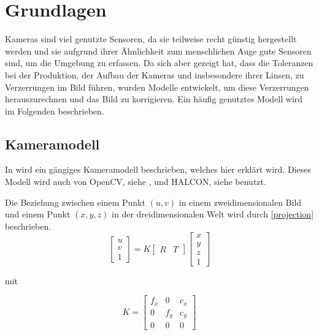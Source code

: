 \chapter{Grundlagen}
\label{chap:grundlagen}
Kameras sind viel genutzte Sensoren, da sie teilweise recht günstig hergestellt werden und sie aufgrund ihrer Ähnlichkeit zum menschlichen Auge gute Sensoren sind, um die Umgebung zu erfassen. Da sich aber gezeigt hat, dass die Toleranzen bei der Produktion, der Aufbau der Kameras und insbesondere ihrer Linsen, zu Verzerrungen im Bild führen, wurden Modelle entwickelt, um diese Verzerrungen herauszurechnen und das Bild zu korrigieren. Ein häufig genutztes Modell wird im Folgenden beschrieben.

\section{Kameramodell} %
\label{sec:kameramodell}
In \cite{Zhang} wird ein gängiges Kameramodell beschrieben, welches hier erklärt wird. Dieses Modell wird auch von OpenCV, siehe \cite{opencv}, und HALCON, siehe \cite{halcon} benutzt.

Die Beziehung zwischen einem Punkt $(u, v)$ in einem zweidimensionalen Bild und einem Punkt $(x, y, z)$ in der dreidimensionalen Welt wird durch \autoref{projection} beschrieben.
\newpage
\begin{equation}
\begin{bmatrix}
 	u \\
 	v \\
 	1
\end{bmatrix} = K 
\begin{bmatrix}
   	R & T
\end{bmatrix} 
\begin{bmatrix}
   	x \\
   	y \\
   	z \\
   	1
\end{bmatrix} \label{projection}
\end{equation}

mit 

\begin{equation}
  K = 
  \begin{bmatrix}
  	f_x & 0 & c_x \\
  	0 & f_y & c_y \\
  	0 & 0 & 0
  \end{bmatrix}
\end{equation}

